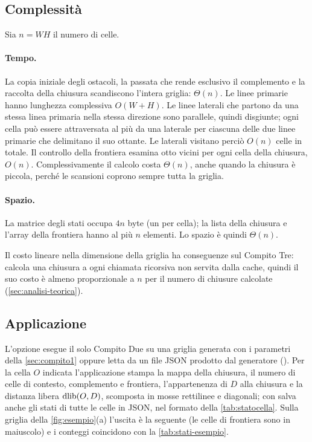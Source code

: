 \subsection{Complessità}
\label{sec:complessita-chiusura}

Sia $n = WH$ il numero di celle.

\paragraph{Tempo.} La copia iniziale degli ostacoli, la passata che rende
esclusivo il complemento e la raccolta della chiusura scandiscono l'intera
griglia: $\Theta(n)$. Le linee primarie hanno lunghezza complessiva
$O(W+H)$. Le linee laterali che partono da una stessa linea primaria nella
stessa direzione sono parallele, quindi disgiunte; ogni cella può essere
attraversata al più da una laterale per ciascuna delle due linee primarie che
delimitano il suo ottante.
Le laterali visitano perciò $O(n)$ celle in totale. Il controllo della
frontiera esamina otto vicini per ogni cella della chiusura, $O(n)$.
Complessivamente il calcolo costa $\Theta(n)$, anche quando la chiusura è
piccola, perché le scansioni coprono sempre tutta la griglia.

\paragraph{Spazio.} La matrice degli stati occupa $4n$ byte (un 
per cella); la lista della chiusura e l'array della frontiera hanno al più
$n$ elementi. Lo spazio è quindi $\Theta(n)$.

Il costo lineare nella dimensione della griglia ha conseguenze sul Compito
Tre: \cmin{} calcola una chiusura a ogni chiamata ricorsiva non servita
dalla cache, quindi il suo costo è almeno proporzionale a $n$ per il numero
di chiusure calcolate (\cref{sec:analisi-teorica}).

\subsection{Applicazione}
\label{sec:applicazione-chiusura}

L'opzione  esegue il solo Compito Due su una griglia
generata con i parametri della \cref{sec:compito1} oppure letta da un file
JSON prodotto dal generatore (). Per la cella $O$
indicata l'applicazione stampa la mappa della chiusura, il numero di celle di
contesto, complemento e frontiera, l'appartenenza di $D$ alla chiusura e la
distanza libera $\operatorname{dlib}(O,D)$, scomposta in mosse rettilinee e diagonali; con
 salva anche gli stati di tutte le celle in JSON,
nel formato della \cref{tab:statocella}. Sulla griglia della
\cref{fig:esempio}(a) l'uscita è la seguente (le celle di frontiera
sono in maiuscolo) e i conteggi coincidono con la \cref{tab:stati-esempio}.


